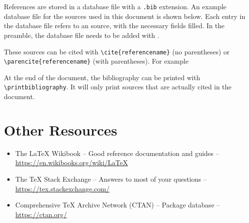 \documentclass{article}
\begin{document}
References are stored in a database file with a \lstinline{.bib} extension. An example database file for the sources used in this document is shown below. Each entry in the database file refers to an source, with the necessary fields filled. In the preamble, the database file needs to be added with \lstinline||.

These sources can be cited with \lstinline|\cite{referencename}| (no parentheses) or \lstinline|\parencite{referencename}| (with parentheses). For example \parencite{strzodka_gpu-accelerated_2013} \parencite{yu_gpu_2014}

At the end of the document, the bibliography can be printed with \lstinline{\printbibliography}. It will only print sources that are actually cited in the document.

\section{Other Resources}
\begin{itemize}
  \item The \LaTeX{} Wikibook -- Good reference documentation and guides -- \url{https://en.wikibooks.org/wiki/LaTeX}
  \item The \TeX{} Stack Exchange -- Answers to most of your questions -- \url{https://tex.stackexchange.com/}
  \item Comprehensive \TeX{} Archive Network (CTAN) -- Package database -- \url{https://ctan.org/}
\end{itemize}

\printbibliography
\end{document}
